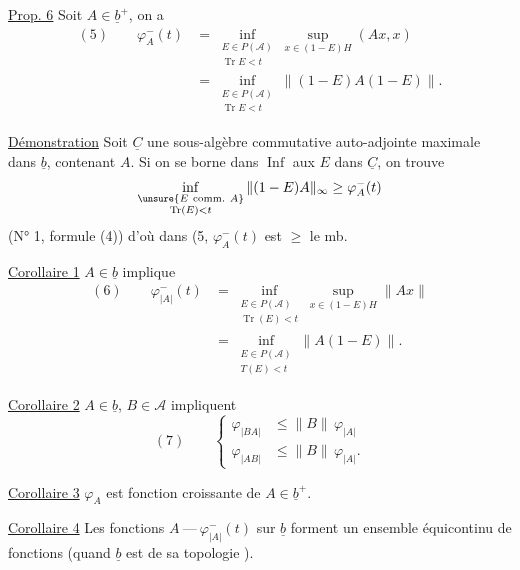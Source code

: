 
\uline{Prop. 6} Soit $A\in\underline b^+$, on a
\[
\begin{aligned}
(5)\qquad \varphi_A^-(t)
 &=\inf_{\substack{E\in P(\mathcal A)\\ \operatorname{Tr}E<t}}
       \sup_{x\in(1-E)H}(Ax,x)\\
 &=\inf_{\substack{E\in P(\mathcal A)\\ \operatorname{Tr}E<t}}
       \|(1-E)A(1-E)\|.
\end{aligned}
\]

\uline{Démonstration} Soit $\underline C$  une sous-algèbre commutative auto-adjointe maximale dans $\underline b$, contenant $A$. Si on se borne dans  $\operatorname{Inf}$ aux $E$  dans $\underline C$, on trouve
\[
\inf_{\substack{\unsure{E\mathrm{\ comm.\ }A}\\ \operatorname{Tr}(E)<t}}
\|(1-E)A\|_\infty\geq\varphi_A^-(t)
\]
\margin{$\unsure{\Downarrow}$}
(N° 1, formule (4)) d'où  dans (5, $\varphi_A^-(t)$ est $\geq$ le  mb.

\uline{Corollaire 1} $A\in\underline b$ implique
\[
\begin{aligned}
(6)\qquad \varphi_{|A|}^-(t)
 &=\inf_{\substack{E\in P(\mathcal A)\\ \operatorname{Tr}(E)<t}}
       \sup_{x\in(1-E)H}\|Ax\|\\
 &=\inf_{\substack{E\in P(\mathcal A)\\ T(E)<t}}\|A(1-E)\|.
\end{aligned}
\]

\uline{Corollaire 2} $A\in\underline b$, $B\in\mathcal A$ impliquent
\[
(7)\qquad
\left\{\begin{aligned}
\varphi_{|BA|}&\leq\|B\|\,\varphi_{|A|}\\
\varphi_{|AB|}&\leq\|B\|\,\varphi_{|A|}.
\end{aligned}\right.
\]

\uline{Corollaire 3} $\varphi_A$ est fonction croissante de $A\in\underline b^+$.

\uline{Corollaire 4} Les fonctions $A\ \text{---}\ \varphi_{|A|}^-(t)$ sur $\underline b$ forment un ensemble équicontinu de fonctions (quand $\underline b$ est  de sa topologie ).
\margin{$\Big|$}

